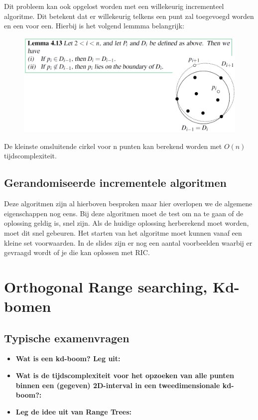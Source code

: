 \documentclass[12pt,a4paper]{article}
\begin{document}
	Dit probleem kan ook opgelost worden met een willekeurig incrementeel algoritme. Dit betekent dat er willekeurig telkens een punt zal toegevoegd worden en een voor een. Hierbij is het volgend lemmma belangrijk: 
	\begin{figure}[H]
		\centering
		\includegraphics[width=0.8\linewidth]{afbeeldingen/cirkel-lemma}
		\label{fig:cirkel-lemma}
	\end{figure}
	
	De kleinste omsluitende cirkel voor n punten kan berekend worden met $O(n)$ tijdscomplexiteit. 
	
	
	\subsection{Gerandomiseerde incrementele algoritmen}
	Deze algoritmen zijn al hierboven besproken maar hier overlopen we de algemene eigenschappen nog eens. Bij deze algoritmen moet de test om na te gaan of de oplossing geldig is, snel zijn. Als de huidige oplossing herberekend moet worden, moet dit snel gebeuren. Het starten van het algoritme moet kunnen vanaf een kleine set voorwaarden. In de slides zijn er nog een aantal voorbeelden waarbij er gevraagd wordt of je die kan oplossen met RIC. 
	
	
	\section{Orthogonal Range searching, Kd-bomen}
	\subsection{Typische examenvragen}
	\begin{itemize}
		\item \textbf{Wat is een kd-boom? Leg uit:}\\
		\item \textbf{Wat is de tijdscomplexiteit voor het opzoeken van alle punten binnen een (gegeven) 2D-interval in een tweedimensionale kd-boom?:}\\
		\item \textbf{Leg de idee uit van Range Trees:}\\
	\end{itemize}
	
\end{document}
